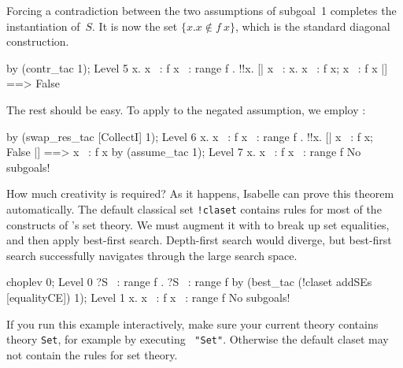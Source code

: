 Forcing a contradiction between the two assumptions of subgoal~1
completes the instantiation of~$S$.  It is now the set $\{x. x\not\in
f~x\}$, which is the standard diagonal construction.
\begin{ttbox}
by (contr_tac 1);
{\out Level 5}
{\out {\ttlbrace}x. x ~: f x{\ttrbrace} ~: range f}
{. !!x. [| x ~: {\ttlbrace}x. x ~: f x{\ttrbrace}; x ~: f x |] ==> False}
\end{ttbox}
The rest should be easy.  To apply  to the negated
assumption, we employ :
\begin{ttbox}
by (swap_res_tac [CollectI] 1);
{\out Level 6}
{\out {\ttlbrace}x. x ~: f x{\ttrbrace} ~: range f}
{. !!x. [| x ~: f x; ~ False |] ==> x ~: f x}
\ttbreak
by (assume_tac 1);
{\out Level 7}
{\out {\ttlbrace}x. x ~: f x{\ttrbrace} ~: range f}
{\out No subgoals!}
\end{ttbox}
How much creativity is required?  As it happens, Isabelle can prove this
theorem automatically.  The default classical set {\tt!claset} contains rules
for most of the constructs of \HOL's set theory.  We must augment it with
 to break up set equalities, and then apply best-first
search.  Depth-first search would diverge, but best-first search
successfully navigates through the large search space.
\begin{ttbox}
choplev 0;
{\out Level 0}
{\out ?S ~: range f}
{. ?S ~: range f}
\ttbreak
by (best_tac (!claset addSEs [equalityCE]) 1);
{\out Level 1}
{\out {\ttlbrace}x. x ~: f x{\ttrbrace} ~: range f}
{\out No subgoals!}
\end{ttbox}
If you run this example interactively, make sure your current theory contains
theory \texttt{Set}, for example by executing
~{\tt"Set"}.  Otherwise the default claset may not
contain the rules for set theory.

